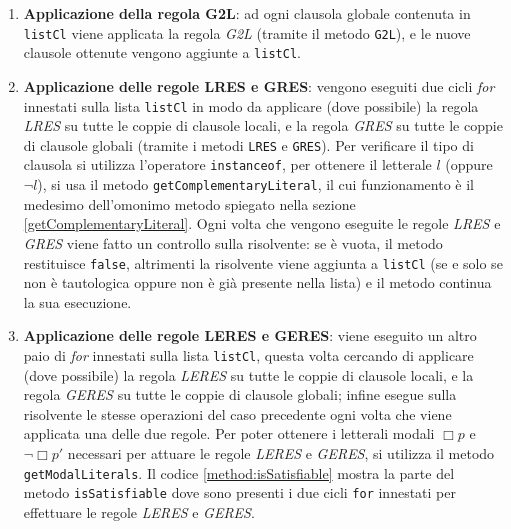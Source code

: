 \documentclass[a4paper,12pt]{report}
\begin{document}
\begin{enumerate}
    \item \textbf{Applicazione della regola G2L}: ad ogni clausola globale contenuta in \texttt{listCl} viene applicata la regola \emph{G2L} (tramite il metodo \texttt{G2L}), e le nuove clausole ottenute vengono aggiunte a \texttt{listCl}.
    
    \item \textbf{Applicazione delle regole LRES e GRES}: vengono eseguiti due cicli \emph{for} innestati sulla lista \texttt{listCl} in modo da applicare (dove possibile) la regola \emph{LRES} su tutte le coppie di clausole locali, e la regola \emph{GRES} su tutte le coppie di clausole globali (tramite i metodi \texttt{LRES} e \texttt{GRES}). Per verificare il tipo di clausola si utilizza l'operatore \texttt{instanceof}, per ottenere il letterale $l$ (oppure $\lnot l$), si usa il metodo \texttt{getComplementaryLiteral}, il cui funzionamento è il medesimo dell'omonimo metodo spiegato nella sezione \ref{getComplementaryLiteral}. Ogni volta che vengono eseguite le regole \emph{LRES} e \emph{GRES} viene fatto un controllo sulla risolvente: se è vuota, il metodo restituisce \texttt{false}, altrimenti la risolvente viene aggiunta a \texttt{listCl} (se e solo se non è tautologica oppure non è già presente nella lista) e il metodo continua la sua esecuzione.
    
    \item \textbf{Applicazione delle regole LERES e GERES}: viene eseguito un altro paio di \emph{for} innestati sulla lista \texttt{listCl}, questa volta cercando di applicare (dove possibile) la regola \emph{LERES} su tutte le coppie di clausole locali, e la regola \emph{GERES} su tutte le coppie di clausole globali; infine esegue sulla risolvente le stesse operazioni del caso precedente ogni volta che viene applicata una delle due regole. Per poter ottenere i letterali modali $\Box p$ e $\lnot \Box p'$ necessari per attuare le regole \emph{LERES} e \emph{GERES}, si utilizza il metodo \texttt{getModalLiterals}. Il codice \ref{method:isSatisfiable} mostra la parte del metodo \texttt{isSatisfiable} dove sono presenti i due cicli \texttt{for} innestati per effettuare le regole \emph{LERES} e \emph{GERES}.
\end{enumerate}
\end{document}

